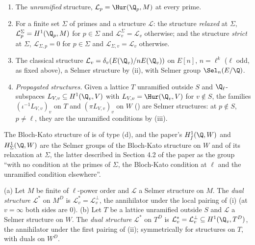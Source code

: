 \begin{example}\label{ex:galcoh:selmer-structures}
\begin{enumerate}[label=(\alph*)]
\item The \emph{unramified} structure, $\mathcal L_p=\Hur(\Q_p,M)$ at every prime.
\item For a finite set $\Sigma$ of primes and a structure $\mathcal L$: the structure \emph{relaxed} at $\Sigma$, $\mathcal L^\Sigma_p=H^1(\Q_p,M)$ for $p\in\Sigma$ and $\mathcal L^\Sigma_v=\mathcal L_v$
otherwise; and the structure \emph{strict} at $\Sigma$, $\mathcal L_{\Sigma,p}=0$ for $p\in\Sigma$ and $\mathcal L_{\Sigma,v}=\mathcal L_v$ otherwise.
\item The classical structure $\mathcal L_v=\delta_v(E(\Q_v)/nE(\Q_v))$ on $E[n]$, $n=\ell^k$ ($\ell$ odd, as fixed above), a Selmer structure by (ii), with Selmer group
$\Sel_n(E/\Q)$.
\item \emph{Propagated structures.} Given a lattice $T$ unramified outside $S$ and $\Q_\ell$-subspaces $L_{V,v}\subseteq H^1(\Q_v,V)$ with $L_{V,v}=\Hur(\Q_v,V)$ for $v\notin S$, the
families $(\iota^{-1}L_{V,v})_v$ on $T$ and $(\pi L_{V,v})_v$ on $W$ () are Selmer structures: at $p\notin S$, $p\ne\ell$, they are the unramified
conditions by (iii).
\end{enumerate}
The Bloch-Kato structure of  is of type (d), and the paper's $H^1_f(\Q,W)$ and $H^1_\Sigma(\Q,W)$ are the Selmer groups of the Bloch-Kato structure on $W$
and of its relaxation at $\Sigma$, the latter described in Section 4.2 of the paper as the group ``with no condition at the primes of $\Sigma$, the Bloch-Kato condition at
$\ell$ and the unramified condition elsewhere''.
\end{example}

\begin{definition}\label{def:galcoh:dual-structure}
(a) Let $M$ be finite of $\ell$-power order and $\mathcal L$ a Selmer structure on $M$. The \emph{dual structure} $\mathcal L^*$ on $M^D$ is $\mathcal L^*_v=\mathcal L_v^\perp$, the
annihilator under the local pairing of (i) (at $v=\infty$ both sides are $0$).
(b) Let $T$ be a lattice unramified outside $S$ and $\mathcal L$ a Selmer structure on $W$. The \emph{dual structure} $\mathcal L^*$ on $T^D$ is $\mathcal L^*_v=\mathcal L_v^\perp\subseteq H^1(\Q_v,T^D)$,
the annihilator under the first pairing of (ii); symmetrically for structures on $T$, with duals on $W^D$.
\end{definition}

